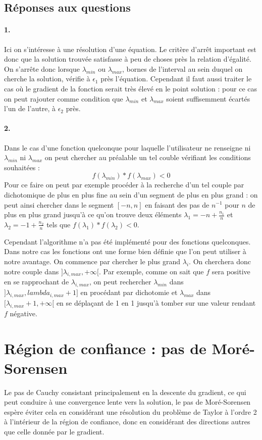 \documentclass[12pt]{article}	%
\begin{document}
\subsection{Réponses aux questions}
\paragraph{1.}
Ici on s'intéresse à une résolution d'une équation. Le critère d'arrêt important est donc que la solution trouvée satisfasse à peu de choses près la relation d'égalité. On s'arrête donc lorsque $\lambda_{min}$ ou $\lambda_{max}$, bornes de l'interval au sein duquel on cherche la solution, vérifie à $\epsilon_1$ près l'équation. Cependant il faut aussi traiter le cas où le gradient de la fonction serait très élevé en le point solution : pour ce cas on peut rajouter comme condition que $\lambda_{min}$ et $\lambda_{max}$ soient suffisemment écartés l'un de l'autre, à $\epsilon_2$ près.
\paragraph{2.}
Dans le cas d'une fonction quelconque pour laquelle l'utilisateur ne renseigne ni $\lambda_{min}$ ni $\lambda_{max}$ on peut chercher au préalable un tel couble vérifiant les conditions souhaitées :
\[f(\lambda_{min}) * f(\lambda_{max}) < 0\]
Pour ce faire on peut par exemple procéder à la recherche d'un tel couple par dichotomique de plus en plus fine au sein d'un segment de plus en plus grand : on peut ainsi chercher dans le segment $[-n, n]$ en faisant des pas de $n^{-1}$ pour $n$ de plus en plus grand jusqu'à ce qu'on trouve deux éléments $\lambda_1 = -n + \frac{n_1}{n}$ et $\lambda_2 = -1 + \frac{n_2}{n}$ tels que $f(\lambda_1) * f(\lambda_2) < 0$.

Cependant l'algorithme n'a pas été implémenté pour des fonctions quelconques. Dans notre cas les fonctions ont une forme bien définie que l'on peut utiliser à notre avantage. On commence par chercher le plus grand $\lambda_i$. On cherchera donc notre couple dans $]\lambda_{i, max}, +\infty[$. Par exemple, comme on sait que $f$ sera positive en se rapprochant de $\lambda_{i, max}$, on peut rechercher $\lambda_{min}$ dans $]\lambda_{i, max}, lambda_{i, max}+1]$ en procédant par dichotomie et $\lambda_{max}$ dans $[\lambda_{i, max}+1, +\infty[$ en se déplaçant de 1 en 1 jusqu'à tomber sur une valeur rendant $f$ négative.

\section{Région de confiance : pas de Moré-Sorensen}
Le pas de Cauchy consistant principalement en la descente du gradient, ce qui peut conduire à une convergence lente vers la solution, le pas de Moré-Sorensen espère éviter cela en considérant une résolution du problème de Taylor à l'ordre 2 à l'intérieur de la région de confiance, donc en considérant des directions autres que celle donnée par le gradient.
\end{document}
